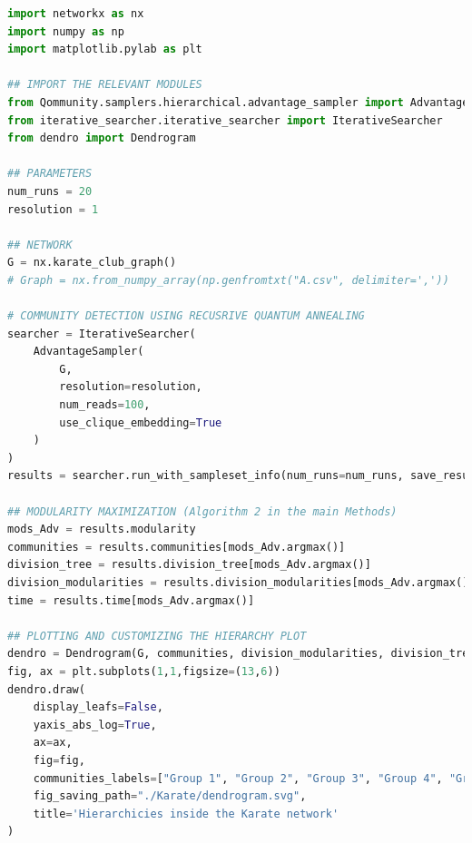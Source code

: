\documentclass[pdflatex,sn-mathphys-num]{sn-jnl}%
\begin{document}
\begin{lstlisting}[language=Python, caption=Example to obtain the hierarchical structure of a given network using modularity maximization., label=python2]
import networkx as nx
import numpy as np
import matplotlib.pylab as plt

## IMPORT THE RELEVANT MODULES
from Qommunity.samplers.hierarchical.advantage_sampler import AdvantageSampler
from iterative_searcher.iterative_searcher import IterativeSearcher
from dendro import Dendrogram

## PARAMETERS
num_runs = 20
resolution = 1

## NETWORK
G = nx.karate_club_graph()
# Graph = nx.from_numpy_array(np.genfromtxt("A.csv", delimiter=','))

# COMMUNITY DETECTION USING RECUSRIVE QUANTUM ANNEALING
searcher = IterativeSearcher(
    AdvantageSampler(
        G, 
        resolution=resolution, 
        num_reads=100, 
        use_clique_embedding=True
    )
)
results = searcher.run_with_sampleset_info(num_runs=num_runs, save_results=False, saving_path=None, iterative_verbosity=0)

## MODULARITY MAXIMIZATION (Algorithm 2 in the main Methods)
mods_Adv = results.modularity
communities = results.communities[mods_Adv.argmax()]
division_tree = results.division_tree[mods_Adv.argmax()]
division_modularities = results.division_modularities[mods_Adv.argmax()]
time = results.time[mods_Adv.argmax()]

## PLOTTING AND CUSTOMIZING THE HIERARCHY PLOT
dendro = Dendrogram(G, communities, division_modularities, division_tree)
fig, ax = plt.subplots(1,1,figsize=(13,6))
dendro.draw(
    display_leafs=False,
    yaxis_abs_log=True,
    ax=ax,
    fig=fig,
    communities_labels=["Group 1", "Group 2", "Group 3", "Group 4", "Group 5", "Group 6", "Group 7", "Group 8"],
    fig_saving_path="./Karate/dendrogram.svg",
    title='Hierarchicies inside the Karate network'
)
\end{lstlisting}



\end{document}

